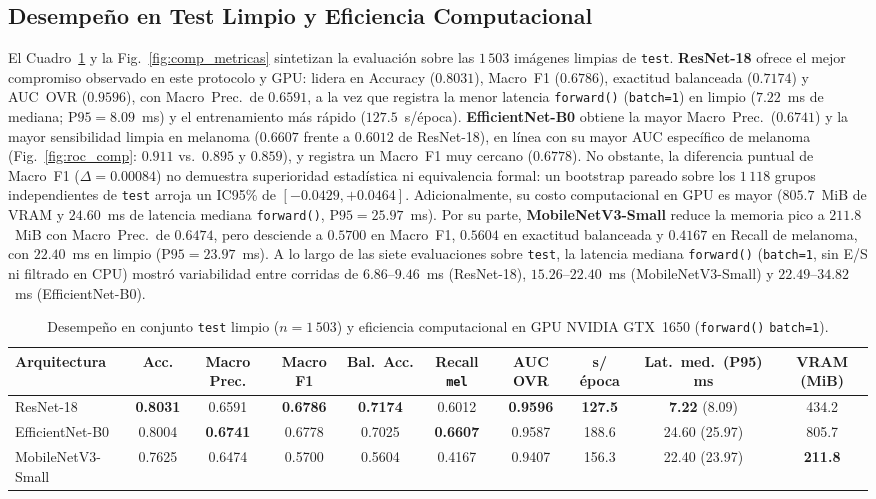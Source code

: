 \documentclass[conference]{IEEEtran}
\begin{document}
\subsection{Desempe\~no en Test Limpio y Eficiencia Computacional}
El Cuadro~\ref{tab:res} y la Fig.~\ref{fig:comp_metricas} sintetizan la evaluaci\'on sobre las $1\,503$ im\'agenes limpias de \texttt{test}. \textbf{ResNet-18} ofrece el mejor compromiso observado en este protocolo y GPU: lidera en Accuracy ($0.8031$), Macro~F1 ($0.6786$), exactitud balanceada ($0.7174$) y AUC~OVR ($0.9596$), con Macro~Prec.\ de $0.6591$, a la vez que registra la menor latencia \texttt{forward()} (\texttt{batch=1}) en limpio ($7.22$~ms de mediana; $\mathrm{P95}=8.09$~ms) y el entrenamiento m\'as r\'apido ($127.5$~s/\'epoca). \textbf{EfficientNet-B0} obtiene la mayor Macro~Prec.\ ($0.6741$) y la mayor sensibilidad limpia en melanoma ($0.6607$ frente a $0.6012$ de ResNet-18), en l\'inea con su mayor AUC espec\'ifico de melanoma (Fig.~\ref{fig:roc_comp}: $0.911$ vs.\ $0.895$ y $0.859$), y registra un Macro~F1 muy cercano ($0.6778$). No obstante, la diferencia puntual de Macro~F1 ($\Delta=0.00084$) no demuestra superioridad estad\'istica ni equivalencia formal: un bootstrap pareado sobre los $1\,118$ grupos independientes de \texttt{test} arroja un IC95\% de $[-0.0429, +0.0464]$. Adicionalmente, su costo computacional en GPU es mayor ($805.7$~MiB de VRAM y $24.60$~ms de latencia mediana \texttt{forward()}, $\mathrm{P95}=25.97$~ms). Por su parte, \textbf{MobileNetV3-Small} reduce la memoria pico a $211.8$~MiB con Macro~Prec.\ de $0.6474$, pero desciende a $0.5700$ en Macro~F1, $0.5604$ en exactitud balanceada y $0.4167$ en Recall de melanoma, con $22.40$~ms en limpio ($\mathrm{P95}=23.97$~ms). A lo largo de las siete evaluaciones sobre \texttt{test}, la latencia mediana \texttt{forward()} (\texttt{batch=1}, sin E/S ni filtrado en CPU) mostr\'o variabilidad entre corridas de $6.86\text{--}9.46$~ms (ResNet-18), $15.26\text{--}22.40$~ms (MobileNetV3-Small) y $22.49\text{--}34.82$~ms (EfficientNet-B0).

\begin{table}[t]
\centering\scriptsize
\setlength{\tabcolsep}{3.5pt}
\caption{Desempe\~no en conjunto \texttt{test} limpio ($n=1\,503$) y eficiencia computacional en GPU NVIDIA GTX~1650 (\texttt{forward()} \texttt{batch=1}).}
\label{tab:res}
\begin{tabular}{lccccccccc}\toprule
Arquitectura & Acc. & Macro Prec. & Macro F1 & Bal.\ Acc. & Recall \texttt{mel} & AUC OVR & s/\'epoca & Lat.\ med.\ (P95) ms & VRAM (MiB) \\ \midrule
ResNet-18 & \textbf{0.8031} & 0.6591 & \textbf{0.6786} & \textbf{0.7174} & 0.6012 & \textbf{0.9596} & \textbf{127.5} & \textbf{7.22} (8.09) & 434.2 \\
EfficientNet-B0 & 0.8004 & \textbf{0.6741} & 0.6778 & 0.7025 & \textbf{0.6607} & 0.9587 & 188.6 & 24.60 (25.97) & 805.7 \\
MobileNetV3-Small & 0.7625 & 0.6474 & 0.5700 & 0.5604 & 0.4167 & 0.9407 & 156.3 & 22.40 (23.97) & \textbf{211.8} \\
\bottomrule\end{tabular}
\end{table}
\end{document}
